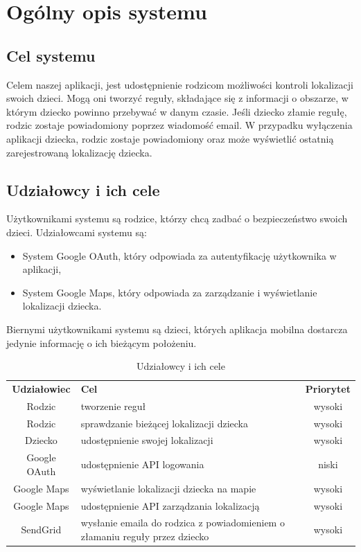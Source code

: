 \documentclass{sprawozdanie-agh}
\begin{document}
	


	\section{Ogólny opis systemu}

		\subsection{Cel systemu}

			Celem naszej aplikacji, jest udostępnienie rodzicom możliwości kontroli lokalizacji swoich dzieci. Mogą oni tworzyć reguły, składające się z informacji o obszarze, w którym dziecko powinno przebywać w danym czasie. Jeśli dziecko złamie regułę, rodzic zostaje powiadomiony poprzez wiadomość email. W przypadku wyłączenia aplikacji dziecka, rodzic zostaje powiadomiony oraz może wyświetlić ostatnią zarejestrowaną lokalizację dziecka.

		\subsection{Udziałowcy i ich cele}

			Użytkownikami systemu są rodzice, którzy chcą zadbać o bezpieczeństwo swoich dzieci. Udziałowcami systemu są:

			\begin{itemize}
				\item System Google OAuth, który odpowiada za autentyfikację użytkownika w aplikacji,
				\item System Google Maps, który odpowiada za zarządzanie i wyświetlanie lokalizacji dziecka.
			\end{itemize}
			Biernymi użytkownikami systemu są dzieci, których aplikacja mobilna dostarcza jedynie informację o ich bieżącym położeniu.

			\begin{table}[h]
				\begin{center}
					\begin{tabular}{|c|p{7cm}|c|}
						\cline{1-3}
						\textbf{Udziałowiec} & \textbf{Cel} & \textbf{Priorytet} \\
						\cline{1-3}
						Rodzic & tworzenie reguł & wysoki \\
						\cline{1-3}
						Rodzic & sprawdzanie bieżącej lokalizacji dziecka & wysoki \\
						\cline{1-3}
						Dziecko & udostępnienie swojej lokalizacji & wysoki \\
						\cline{1-3}
						Google OAuth & udostępnienie API logowania & niski \\
						\cline{1-3}
						Google Maps & wyświetlanie lokalizacji dziecka na mapie & wysoki \\
						\cline{1-3}
						Google Maps & udostępnienie API zarządzania lokalizacją & wysoki \\
						\cline{1-3}
						SendGrid & wysłanie emaila do rodzica z powiadomieniem o złamaniu reguły przez dziecko  & wysoki \\
						\cline{1-3}
					\end{tabular}
				\end{center}
				\caption{Udziałowcy i ich cele}
			\end{table}
\end{document}
